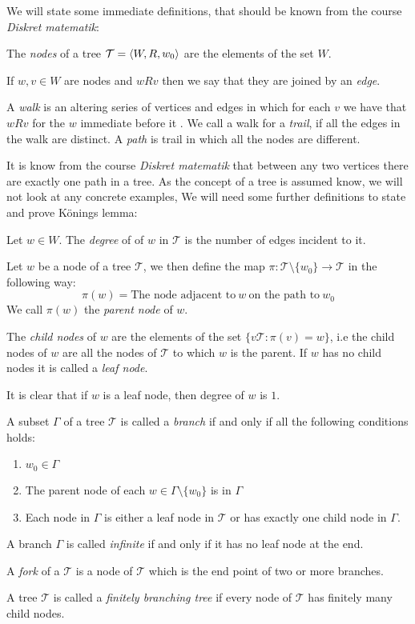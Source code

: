 \documentclass[../main.tex]{subfiles}
\begin{document}
We will state some immediate definitions, that should be known from the course
\textit{Diskret matematik}:
\begin{defi}
	The \textit{nodes} of a tree $\mathcal{T}=\langle W,R,w_0\rangle$ are the
	elements of the set $W$.

	If $w,v\in W$ are nodes and  $wRv$ then we say that they are joined  by an \textit{edge}.


	A \textit{walk} is an altering series of vertices and edges in
	which for each $v$ we have that $wRv$ for the $w$ immediate before it 
	. We call a walk for a \textit{trail}, if all the edges in
	the walk are distinct. A \textit{path} is trail in which all the
	nodes are different.
\end{defi}


It is know from the course \textit{Diskret matematik} that between any two
vertices there are exactly one path in a tree. 
As the concept of a tree is assumed know, we will not look at any concrete
examples,
We will need
some further definitions to state and prove Könings lemma:
\begin{defi}
	Let $w\in W$. The \textit{degree} of of $w$ in $\mathcal{T}$ is the
	number of edges incident to it.
\end{defi}
\begin{defi}
	Let $w$ be a node of a tree $\mathcal{T}$, we then define the map
	$\pi:\mathcal{T}\setminus\{w_0\}\rightarrow\mathcal{T}$ in the
	following way:
	\[\pi(w)=\text{The node adjacent to}\ w\ \text{on the path to}\ w_0\]
	We call $\pi(w)$ the \textit{parent node} of $w$. 

	The \textit{child nodes} of $w$ are the elements of the set
	$\{v\mathcal{T}:\pi(v)=w\}$, i.e the child nodes of $w$ are all the
	nodes of $\mathcal{T}$ to which $w$ is the parent. If $w$ has no child
	nodes it is called a \textit{leaf node}.
\end{defi}
It is clear that if $w$ is a leaf node, then degree of $w$ is $1$.
\begin{defi}
	A subset $\Gamma$ of a tree $\mathcal{T}$ is called a
	\textit{branch} if and only if all the following conditions holds:
	\begin{enumerate}
		\item $w_0\in\Gamma$
		\item The parent node of each $w\in\Gamma\setminus\{w_0\}$ is
			in $\Gamma$
		\item Each node in $\Gamma$ is either a leaf node in
			$\mathcal{T}$ or has exactly one child node in
			$\Gamma$.
	\end{enumerate}
	A branch $\Gamma$ is called \textit{infinite} if and only if it has no
	leaf node at the end.
\end{defi}
\begin{defi}
	A \textit{fork} of a $\mathcal{T}$ is a node of $\mathcal{T}$ which is the end
	point of two or more branches.
\end{defi}
\begin{defi}
	A tree $\mathcal{T}$ is called a \textit{finitely branching tree} if
	every node of $\mathcal{T}$ has finitely many child nodes.
\end{defi}
\end{document}
